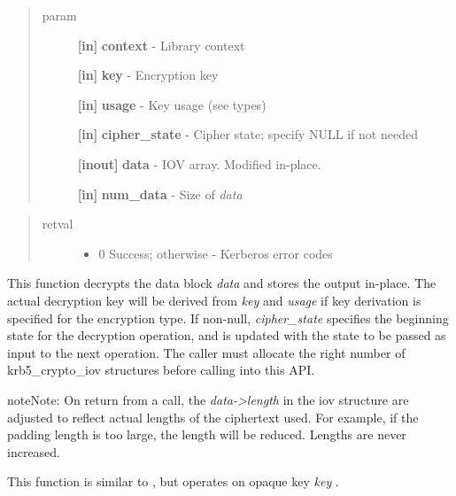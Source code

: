 \documentclass[letterpaper,10pt,english]{sphinxmanual}
\begin{document}
\begin{quote}\begin{description}
\item[{param}] \leavevmode
\textbf{{[}in{]}} \textbf{context} - Library context

\textbf{{[}in{]}} \textbf{key} - Encryption key

\textbf{{[}in{]}} \textbf{usage} - Key usage (see  types)

\textbf{{[}in{]}} \textbf{cipher\_state} - Cipher state; specify NULL if not needed

\textbf{{[}inout{]}} \textbf{data} - IOV array. Modified in-place.

\textbf{{[}in{]}} \textbf{num\_data} - Size of \emph{data}

\end{description}\end{quote}
\begin{quote}\begin{description}
\item[{retval}] \leavevmode\begin{itemize}
\item {} 
0   Success; otherwise - Kerberos error codes

\end{itemize}

\end{description}\end{quote}

This function decrypts the data block \emph{data} and stores the output in-place. The actual decryption key will be derived from \emph{key} and \emph{usage} if key derivation is specified for the encryption type. If non-null, \emph{cipher\_state} specifies the beginning state for the decryption operation, and is updated with the state to be passed as input to the next operation. The caller must allocate the right number of krb5\_crypto\_iov structures before calling into this API.




{\hyperref[appdev/refs/api/krb5_k_encrypt_iov:krb5_k_encrypt_iov]{}}



\begin{notice}{note}{Note:}
On return from a {\hyperref[appdev/refs/api/krb5_c_decrypt_iov:krb5_c_decrypt_iov]{}} call, the \emph{data-\textgreater{}length} in the iov structure are adjusted to reflect actual lengths of the ciphertext used. For example, if the padding length is too large, the length will be reduced. Lengths are never increased.

This function is similar to {\hyperref[appdev/refs/api/krb5_c_decrypt_iov:krb5_c_decrypt_iov]{}} , but operates on opaque key \emph{key} .
\end{notice}
\end{document}
